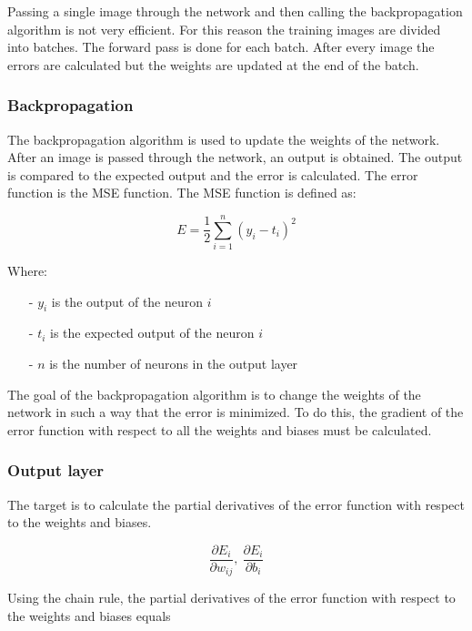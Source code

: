 Passing a single image through the network and then calling the backpropagation algorithm is not very efficient.
For this reason the training images are divided into batches. The forward pass is done for each batch. After 
every image the errors are calculated but the weights are updated at the end of the batch.

\subsubsection{Backpropagation}

The backpropagation algorithm is used to update the weights of the network. After an image is passed through
the network, an output is obtained. The output is compared to the expected output and the error is calculated.
The error function is the MSE function. The MSE function is defined as:

\begin{equation}
    \label{eq:mse}
    E = \frac{1}{2} \sum_{i=1}^n (y_i - t_i)^2
\end{equation}

\noindent
Where:

\begin{itemize}
    \item[-] $y_i$ is the output of the neuron $i$
    \item[-] $t_i$ is the expected output of the neuron $i$
    \item[-] $n$ is the number of neurons in the output layer
\end{itemize}

The goal of the backpropagation algorithm is to change the weights of the network in such a way that the error
is minimized. To do this, the gradient of the error function with respect to all the weights and biases must
be calculated. 

\subsubsection{Output layer}

The target is to calculate the partial derivatives of the error function with respect to the weights and biases.

\begin{equation}
    \label{eq:patrials}
    \frac{\partial E_i}{\partial w_{ij}},\ \frac{\partial E_i}{\partial b_i}
\end{equation}

Using the chain rule, the partial derivatives of the error function with respect to the weights and biases equals

